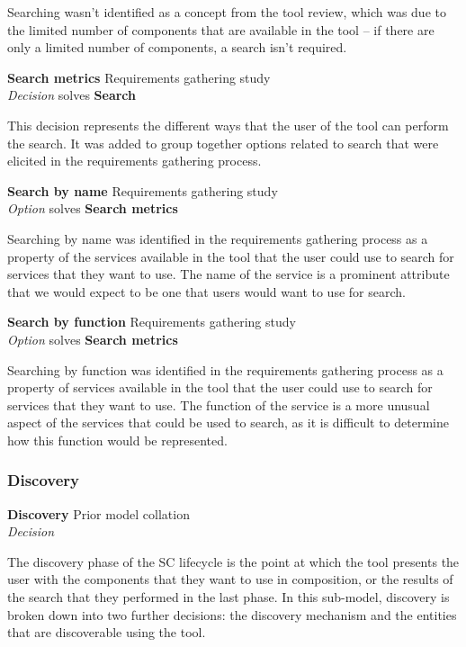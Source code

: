 Searching wasn't identified as a concept from the tool review, which was due to the limited number of components that are available in the tool -- if there are only a limited number of components, a search isn't required.

\textbf{Search metrics} \hfill Requirements gathering study \\ \emph{Decision} \hfill solves \textbf{Search}

This decision represents the different ways that the user of the tool can perform the search. It was added to group together options related to search that were elicited in the requirements gathering process.

\textbf{Search by name} \hfill Requirements gathering study \\ \emph{Option} \hfill solves \textbf{Search metrics}

Searching by name was identified in the requirements gathering process as a property of the services available in the tool that the user could use to search for services that they want to use. The name of the service is a prominent attribute that we would expect to be one that users would want to use for search.

\textbf{Search by function} \hfill Requirements gathering study \\ \emph{Option} \hfill solves \textbf{Search metrics}

Searching by function was identified in the requirements gathering process as a property of services available in the tool that the user could use to search for services that they want to use. The function of the service is a more unusual aspect of the services that could be used to search, as it is difficult to determine how this function would be represented.

\subsubsection{Discovery}

\textbf{Discovery} \hfill Prior model collation \cite{Mehandjiev2012} \\ \emph{Decision} \hfill 

The discovery phase of the SC lifecycle is the point at which the tool presents the user with the components that they want to use in composition, or the results of the search that they performed in the last phase. In this sub-model, discovery is broken down into two further decisions: the discovery mechanism and the entities that are discoverable using the tool.

